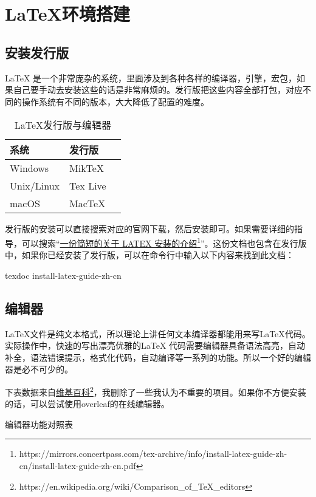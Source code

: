 \chapter{\LaTeX 环境搭建}
\section{安装发行版}
\LaTeX
是一个非常庞杂的系统，里面涉及到各种各样的编译器，引擎，宏包，如果自己要手动去安装这些的话是非常麻烦的。发行版把这些内容全部打包，对应不同的操作系统有不同的版本，大大降低了配置的难度。
\begin{table}[htpb]
	\centering
	\begin{tabular}{ lll } \toprule
		系统       & 发行版   \\          \midrule
		Windows    & MikTeX   \\
		Unix/Linux & Tex Live \\
		macOS      & MacTeX   \\\bottomrule
	\end{tabular}
	\caption{\LaTeX 发行版与编辑器}
\end{table}

发行版的安装可以直接搜索对应的官网下载，然后安装即可。如果需要详细的指导，可以搜索``\href{https://mirrors.concertpass.com/tex-archive/info/install-latex-guide-zh-cn/install-latex-guide-zh-cn.pdf}{一份简短的关于 LATEX
	安装的介绍}\footnote{https://mirrors.concertpass.com/tex-archive/info/install-latex-guide-zh-cn/install-latex-guide-zh-cn.pdf}''。这份文档也包含在发行版中，如果你已经安装了发行版，可以在命令行中输入以下内容来找到此文档：
\begin{shellcmd}
	texdoc install-latex-guide-zh-cn
\end{shellcmd}

\section{编辑器}
\LaTeX 文件是纯文本格式，所以理论上讲任何文本编译器都能用来写\LaTeX 代码。实际操作中，快速的写出漂亮优雅的\LaTeX
代码需要编辑器具备语法高亮，自动补全，语法错误提示，格式化代码，自动编译等一系列的功能。所以一个好的编辑器是必不可少的。

下表数据来自\href{https://en.wikipedia.org/wiki/Comparison_of_TeX_editors}{维基百科}\footnote{https://en.wikipedia.org/wiki/Comparison\_of\_TeX\_editors}，我删除了一些我认为不重要的项目。如果你不方便安装的话，可以尝试使用overleaf的在线编辑器。

\begin{table}[thpb]
	\centering

	\caption{编辑器功能对照表}
\end{table}

